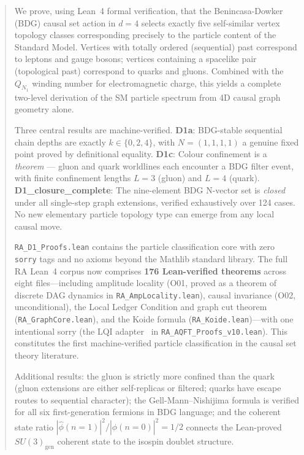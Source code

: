 \documentclass[11pt,a4paper]{article}
\begin{document}
\begin{abstract}
We prove, using Lean~4 formal verification, that the Benincasa-Dowker
(BDG) causal set action in $d=4$ selects exactly five self-similar
vertex topology classes corresponding precisely to the particle content
of the Standard Model. Vertices with totally ordered (sequential) past
correspond to leptons and gauge bosons; vertices containing a spacelike
pair (topological past) correspond to quarks and gluons. Combined with
the $Q_{N_1}$ winding number for electromagnetic charge, this yields
a complete two-level derivation of the SM particle spectrum from
4D causal graph geometry alone.

Three central results are machine-verified.
\textbf{D1a}: BDG-stable sequential chain depths are exactly
$k \in \{0,2,4\}$, with $N{=}(1,1,1,1)$ a genuine fixed point proved
by definitional equality.
\textbf{D1c}: Colour confinement is a \emph{theorem} --- gluon and
quark worldlines each encounter a BDG filter event, with finite
confinement lengths $L{=}3$ (gluon) and $L{=}4$ (quark).
\textbf{D1\_closure\_complete}: The nine-element BDG N-vector set is
\emph{closed} under all single-step graph extensions, verified
exhaustively over 124 cases. No new elementary particle topology
type can emerge from any local causal move.

\texttt{RA\_D1\_Proofs.lean} contains the particle classification core with zero \texttt{sorry} tags and no
axioms beyond the Mathlib standard library. The full RA Lean~4 corpus now comprises \textbf{176 Lean-verified theorems} across eight files---including amplitude locality (O01, proved as a theorem of discrete DAG dynamics in \texttt{RA\_AmpLocality.lean}), causal invariance (O02, unconditional), the Local Ledger Condition and graph cut theorem (\texttt{RA\_GraphCore.lean}), and the Koide formula (\texttt{RA\_Koide.lean})---with one intentional sorry (the LQI adapter~\citep{Meiburg2025LQI} in \texttt{RA\_AQFT\_Proofs\_v10.lean}). This constitutes the first machine-verified particle classification in the
causal set theory literature.

Additional results: the gluon is strictly more confined than the
quark (gluon extensions are either self-replicas or filtered; quarks
have escape routes to sequential character); the Gell-Mann--Nishijima
formula is verified for all six first-generation fermions in BDG
language; and the coherent state ratio
$|\hat{\phi}(n{=}1)|^2/|\hat{\phi}(n{=}0)|^2 = 1/2$ connects the
Lean-proved $SU(3)_{\mathrm{gen}}$ coherent state to the isospin
doublet structure.
\end{abstract}
\end{document}
